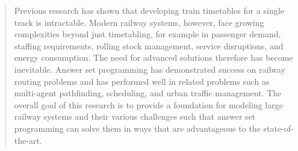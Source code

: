\begin{abstract}
Previous research has shown that developing train timetables for a single track is intractable.
Modern railway systems, however, face growing complexities beyond just timetabling, for example in
passenger demand,
staffing requirements,
rolling stock management,
service disruptions,
and energy consumption.
The need for advanced solutions therefore has become inevitable.
Answer set programming has demonstrated success on railway routing problems
and has performed well in related problems such as 
multi-agent pathfinding,
scheduling, and
urban traffic management.
The overall goal of this research is to provide a foundation for modeling large railway systems
and their various challenges such that answer set programming can solve them
in ways that are advantageous to the state-of-the-art.
\end{abstract}